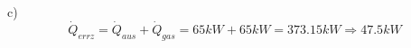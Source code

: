 c) \\
\[
\dot{Q}_{errz} = \dot{Q}_{aus} + \dot{Q}_{gas} = 65kW + 65kW = 373.15kW \Rightarrow 47.5kW
\]